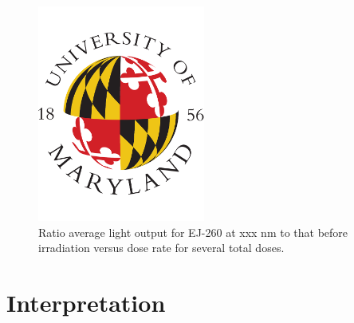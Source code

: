 \documentclass[review]{elsarticle}
\begin{document}
\begin{figure}[!ht]
\begin{center}
\includegraphics[width=0.49\textwidth]{./figures/placeholder.pdf}
\caption{
Ratio average light output for EJ-260 at {\color{red} xxx nm} to that before irradiation versus dose rate for several total doses.
}
\label{fig:fig3}
\end{center}
\end{figure}



\section{Interpretation}
\end{document}
